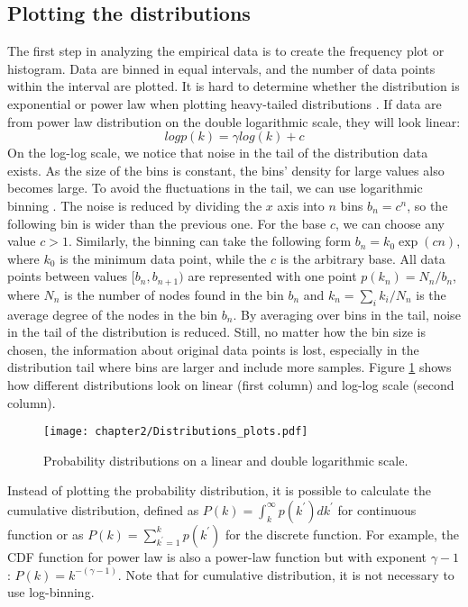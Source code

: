 \subsection{Plotting the distributions}

The first step in analyzing the empirical data is to create the frequency plot or histogram. Data are binned in equal intervals, and the number of data points within the interval are plotted. It is hard to determine whether the distribution is exponential or power law when plotting heavy-tailed distributions \cite{caldarelli2007scalefree}. If data are from power law distribution on the double logarithmic scale, they will look linear:
\begin{equation}
log p(k) = \gamma log(k) + c
\end{equation}  
On the log-log scale, we notice that noise in the tail of the distribution data exists. As the size of the bins is constant, the bins' density for large values also becomes large. To avoid the fluctuations in the tail, we can use logarithmic binning \cite{barabasi2014network, caldarelli2007scalefree, nair2022fundamentals}. The noise is reduced by dividing the $x$ axis into $n$ bins $b_n = c^n$, so the following bin is wider than the previous one. For the base $c$, we can choose any value $c>1$. Similarly, the binning can take the following form $b_n = k_0\exp{(cn)}$, where $k_0$ is the minimum data point, while the $c$ is the arbitrary base. All data points between values $[b_n, b_{n+1})$ are represented with one point $p(k_n) = N_n/b_n$, where $N_n$ is the number of nodes found in the bin $b_n$ and $k_n = \sum_i k_i / N_n$ is the average degree of the nodes in the bin $b_n$. By averaging over bins in the tail, noise in the tail of the distribution is reduced. Still, no matter how the bin size is chosen, the information about original data points is lost, especially in the distribution tail where bins are larger and include more samples. Figure \ref{fig:distributions} shows how different distributions look on linear (first column) and log-log scale (second column).

\begin{figure}[!h]
	\centering
	\texttt{[image: chapter2/Distributions\_plots.pdf]}
	\caption{Probability distributions on a linear and double logarithmic scale.}
	\label{fig:distributions}
\end{figure}

Instead of plotting the probability distribution, it is possible to calculate the cumulative distribution, defined as $P(k) = \int_{k}^{\infty} p(k^{'}) dk^{'}$ for continuous function or as $P(k)=\sum_{k^{'}=1}^{k}p(k^{'})$ for the discrete function. For example, the CDF function for power law is also a power-law function but with exponent $\gamma -1$: $P(k)= k^{-(\gamma-1)}$. Note that for cumulative distribution, it is not necessary to use log-binning.

